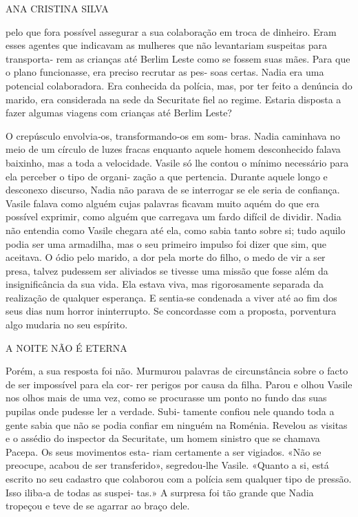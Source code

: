 ANA CRISTINA SILVA

pelo que fora possível assegurar a sua colaboração em troca de dinheiro.
Eram esses agentes que indicavam as mulheres que não levantariam
suspeitas para transporta‑ rem as crianças até Berlim Leste como se
fossem suas mães. Para que o plano funcionasse, era preciso recrutar as
pes‑ soas certas. Nadia era uma potencial colaboradora. Era conhecida da
polícia, mas, por ter feito a denúncia do marido, era considerada na
sede da Securitate fiel ao regime. Estaria disposta a fazer algumas
viagens com crianças até Berlim Leste?

O crepúsculo envolvia‑os, transformando‑os em som‑ bras. Nadia caminhava
no meio de um círculo de luzes fracas enquanto aquele homem desconhecido
falava baixinho, mas a toda a velocidade. Vasile só lhe contou o mínimo
necessário para ela perceber o tipo de organi‑ zação a que pertencia.
Durante aquele longo e desconexo discurso, Nadia não parava de se
interrogar se ele seria de confiança. Vasile falava como alguém cujas
palavras ficavam muito aquém do que era possível exprimir, como alguém
que carregava um fardo difícil de dividir. Nadia não entendia como
Vasile chegara até ela, como sabia tanto sobre si; tudo aquilo podia ser
uma armadilha, mas o seu primeiro impulso foi dizer que sim, que
aceitava. O ódio pelo marido, a dor pela morte do filho, o medo de vir a
ser presa, talvez pudessem ser aliviados se tivesse uma missão que fosse
além da insignificância da sua vida. Ela estava viva, mas rigorosamente
separada da realização de qualquer esperança. E sentia‑se condenada a
viver até ao fim dos seus dias num horror ininterrupto. Se concordasse
com a proposta, porventura algo mudaria no seu espírito.

A NOITE NÃO É ETERNA

Porém, a sua resposta foi não. Murmurou palavras de circunstância sobre
o facto de ser impossível para ela cor‑ rer perigos por causa da filha.
Parou e olhou Vasile nos olhos mais de uma vez, como se procurasse um
ponto no fundo das suas pupilas onde pudesse ler a verdade. Subi‑
tamente confiou nele quando toda a gente sabia que não se podia confiar
em ninguém na Roménia. Revelou as visitas e o assédio do inspector da
Securitate, um homem sinistro que se chamava Pacepa. Os seus movimentos
esta‑ riam certamente a ser vigiados. «Não se preocupe, acabou de ser
transferido», segredou‑lhe Vasile. «Quanto a si, está escrito no seu
cadastro que colaborou com a polícia sem qualquer tipo de pressão. Isso
iliba‑a de todas as suspei‑ tas.» A surpresa foi tão grande que Nadia
tropeçou e teve de se agarrar ao braço dele.

